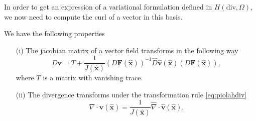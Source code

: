 In order to get an expression of a variational formulation defined in  $H(\textrm{div}, \Omega)$, we now need to compute the curl of a vector in this basis.
\begin{proposition} We have the following properties
\begin{itemize}
\item[(i)] The jacobian matrix of a vector field transforms in the following way
\begin{equation}\label{eq:jactransfdiv}
D \mathbf{v} =  T + \frac{1}{J( \hat{\mathbf{x}})} (D \mathbf{F}( \hat{\mathbf{x}}))^{-1} \hat{D} \hat{\mathbf{v}}( \hat{\mathbf{x}}) (D \mathbf{F}( \hat{\mathbf{x}})),
\end{equation}
where $T$ is a matrix with vanishing trace.
\item[(ii)]
The divergence transforms under the transformation rule \eqref{eq:piolahdiv}
\begin{equation}\label{eq:divtransf}
\nabla\cdot \mathbf{v} ( \hat{\mathbf{x}}) =  \frac{1}{J ( \hat{\mathbf{x}})} \hat{\nabla}\cdot \hat{\mathbf{v}}( \hat{\mathbf{x}}).
\end{equation}
\end{itemize}
\end{proposition}

